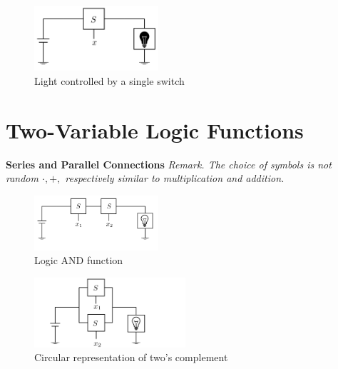 \documentclass[12pt,openany, tikz,border=10pt]{book}
\begin{document}
\begin{figure}[htp] %
    \centering
    \includegraphics[width=0.41\textwidth]{circuits/6.1.2.png} %
    \caption{Light controlled by a single switch}
  \end{figure}


\newpage
\section*{Two-Variable Logic Functions}
\textbf{Series and Parallel Connections}
\newline
\vspace{10px}
\textit{Remark. The choice of symbols is not random $\cdot, +,$ respectively similar to multiplication and addition.}
\vspace{20px}
\begin{figure}[htp] %
    \centering
    \includegraphics[width=0.41\textwidth]{circuits/6.1.3.png} %
    \caption{Logic AND function}
  \end{figure}


 

\begin{figure}[htp] %
    \centering
    \includegraphics[width=0.5\textwidth]{circuits/6.1.3_2.png} %
    \caption{Circular representation of two's complement}
  \end{figure}
\end{document}
